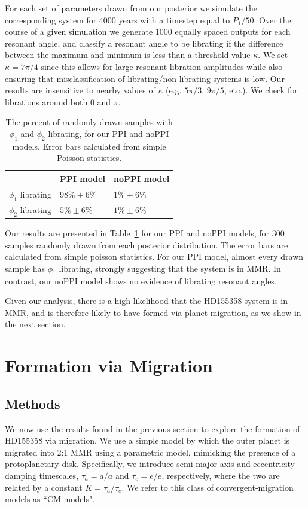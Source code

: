 For each set of parameters drawn from our posterior we simulate the corresponding system for 4000 years with a timestep equal to $P_1/50$. 
Over the course of a given simulation we generate 1000 equally spaced outputs for each resonant angle, and classify a resonant angle to be librating if the difference between the maximum and minimum is less than a threshold value $\kappa$. 
We set $\kappa = 7\pi/4$ since this allows for large resonant libration amplitudes while also ensuring that misclassification of librating/non-librating systems is low. 
Our results are insensitive to nearby values of $\kappa$ (e.g. $5\pi/3$, $9\pi/5$, etc.).
We check for librations around both 0 and $\pi$.

\begin{table}
\begin{tabular}{p{2cm}p{1.8cm}p{1.8cm}}
\hline \hline
 & PPI model & noPPI model \\\hline
$\phi_1$ librating & $98\% \pm 6\%$ & $1\% \pm 6\%$ \\
$\phi_2$ librating & $5\% \pm 6\%$ & $1\% \pm 6\%$ \\
 \hline \hline
\end{tabular}
\caption{
The percent of randomly drawn samples with $\phi_1$ and $\phi_2$ librating, for our PPI and noPPI models. 
Error bars calculated from simple Poisson statistics. 
}
\label{tab:res}
\end{table}

Our results are presented in Table~\ref{tab:res} for our PPI and noPPI models, for 300 samples randomly drawn from each posterior distribution. 
The error bars are calculated from simple poisson statistics.
For our PPI model, almost every drawn sample has $\phi_1$ librating, strongly suggesting that the system is in MMR. 
In contrast, our noPPI model shows no evidence of librating resonant angles.

Given our analysis, there is a high likelihood that the HD155358 system is in MMR, and is therefore likely to have formed via planet migration, as we show in the next section.

\section{Formation via Migration}
\label{sec:form}
\subsection{Methods}
We now use the results found in the previous section to explore the formation of HD155358 via migration.
We use a simple model by which the outer planet is migrated into 2:1 MMR using a parametric model, mimicking the presence of a protoplanetary disk.
Specifically, we introduce semi-major axis and eccentricity damping timescales, $\tau_a = a/\dot{a}$ and $\tau_e = e/\dot{e}$, respectively, where the two are related by a constant $K = \tau_a / \tau_e$. 
We refer to this class of convergent-migration models as ``CM models". 

